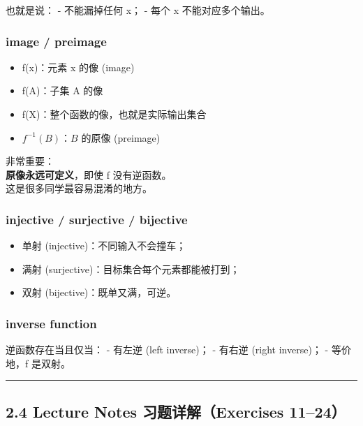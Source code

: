 \documentclass[
  11pt,
]{article}
\providecommand{\tightlist}{%
  \setlength{\itemsep}{0pt}\setlength{\parskip}{0pt}}
\begin{document}
也就是说： - 不能漏掉任何 x； - 每个 x 不能对应多个输出。

\subsubsection{image / preimage}\label{image-preimage}

\begin{itemize}
\tightlist
\item
  f(x)：元素 x 的像 (image)
\item
  f(A)：子集 A 的像
\item
  f(X)：整个函数的像，也就是实际输出集合
\item
  \(f^{-1}(B)\)：\(B\) 的原像 (preimage)
\end{itemize}

非常重要：\\
\textbf{原像永远可定义}，即使 f 没有逆函数。\\
这是很多同学最容易混淆的地方。

\subsubsection{injective / surjective /
bijective}\label{injective-surjective-bijective}

\begin{itemize}
\tightlist
\item
  单射 (injective)：不同输入不会撞车；
\item
  满射 (surjective)：目标集合每个元素都能被打到；
\item
  双射 (bijective)：既单又满，可逆。
\end{itemize}

\subsubsection{inverse function}\label{inverse-function}

逆函数存在当且仅当： - 有左逆 (left inverse)； - 有右逆 (right
inverse)； - 等价地，f 是双射。

\begin{center}\rule{0.5\linewidth}{0.5pt}\end{center}

\subsection{2.4 Lecture Notes 习题详解（Exercises
11--24）}\label{lecture-notes-ux4e60ux9898ux8be6ux89e3exercises-1124}
\end{document}
